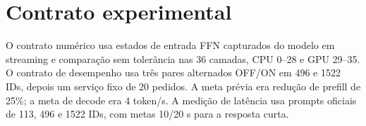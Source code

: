 \section{Contrato experimental}
O contrato numérico usa estados de entrada FFN capturados do modelo em streaming e comparação sem tolerância nas 36 camadas, CPU 0--28 e GPU 29--35. O contrato de desempenho usa três pares alternados OFF/ON em 496 e 1522 IDs, depois um serviço fixo de 20 pedidos. A meta prévia era redução de prefill de 25\%; a meta de decode era 4 token/s. A medição de latência usa prompts oficiais de 113, 496 e 1522 IDs, com metas 10/20 s para a resposta curta.   
